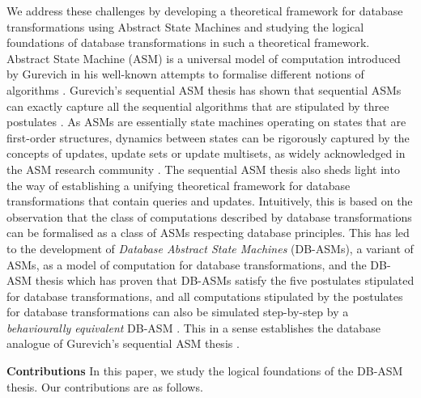 \documentclass[preprint,11pt]{elsarticle}
\theoremstyle{definition}
\theoremstyle{remark}
\begin{document}
We address these challenges by developing a theoretical framework for database transformations using Abstract State Machines and studying the logical foundations of database transformations in such a theoretical framework.
Abstract State Machine (ASM) is a universal model of computation introduced by Gurevich in his well-known attempts to formalise different notions of algorithms
\cite{gurevich:tocl2000,gurevich2004abstract}.
Gurevich's sequential ASM thesis has shown that sequential ASMs can exactly capture all the
sequential algorithms that are stipulated by three postulates \cite{gurevich:tocl2000}.
As ASMs are essentially state machines operating on states that are first-order structures, dynamics between states can be rigorously captured by the concepts of updates, update sets or update multisets, as widely acknowledged in the ASM research community \cite{boerger:2003,gurevich2004abstract}. The sequential ASM thesis also sheds light into the way of establishing
a unifying theoretical framework for database transformations that contain queries and updates. Intuitively, this is based on the observation that the class of computations
described by database transformations can be formalised as a
class of ASMs respecting database principles. This has led to the development of \emph{Database Abstract State
Machines} (DB-ASMs), a variant of ASMs, as a model of computation
for database transformations, and the DB-ASM thesis which has proven that DB-ASMs
satisfy the five postulates stipulated for database transformations, and all
computations stipulated by the postulates for database
transformations can also be simulated step-by-step by a \emph{behaviourally equivalent}
DB-ASM \cite{schewe:Axiomatization}. This in a sense establishes the database analogue of
Gurevich's sequential ASM thesis \cite{gurevich:tocl2000}.








\medskip\noindent \textbf{Contributions}\hspace{0.2cm} In this paper, we study the logical foundations of the
DB-ASM thesis. Our contributions are as follows.
\end{document}
